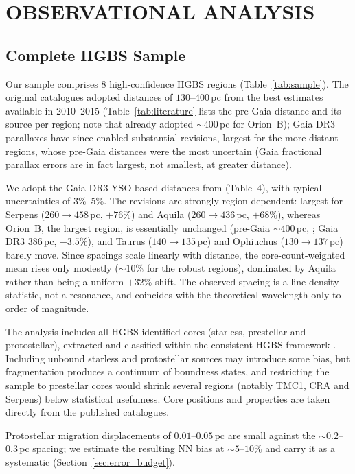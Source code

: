 \documentclass[usenatbib,twoside,twocolumn]{mnras}
\begin{document}
\section{OBSERVATIONAL ANALYSIS}

\subsection{Complete HGBS Sample}

Our sample comprises 8 high-confidence HGBS regions (Table~\ref{tab:sample}). The original catalogues \citep{Konyves2015, Konyves2020, Ladjelate2020, Pezzuto2021} adopted distances of $130$--$400$\,pc from the best estimates available in 2010--2015 (Table~\ref{tab:literature} lists the pre-Gaia distance and its source per region; note that \citealt{Konyves2020} already adopted $\sim400$\,pc for Orion~B); Gaia DR3 parallaxes \citep{Zhang2023} have since enabled substantial revisions, largest for the more distant regions, whose pre-Gaia distances were the most uncertain (Gaia fractional parallax errors are in fact largest, not smallest, at greater distance).

We adopt the Gaia DR3 YSO-based distances from \citet{Zhang2023} (Table~4), with typical uncertainties of 3\%--5\%. The revisions are strongly region-dependent: largest for Serpens ($260\to458$\,pc, $+76\%$) and Aquila ($260\to436$\,pc, $+68\%$), whereas Orion~B, the largest region, is essentially unchanged (pre-Gaia $\sim400$\,pc, \citealt{Konyves2020}; Gaia DR3 $386$\,pc, $-3.5\%$), and Taurus ($140\to135$\,pc) and Ophiuchus ($130\to137$\,pc) barely move. Since spacings scale linearly with distance, the core-count-weighted mean rises only modestly ($\sim10\%$ for the robust regions), dominated by Aquila rather than being a uniform $+32\%$ shift. The observed spacing is a line-density statistic, not a resonance, and coincides with the theoretical wavelength only to order of magnitude.

The analysis includes all HGBS-identified cores (starless, prestellar and protostellar), extracted and classified within the consistent HGBS framework \citep{Konyves2015, Konyves2020}. Including unbound starless and protostellar sources may introduce some bias, but fragmentation produces a continuum of boundness states, and restricting the sample to prestellar cores would shrink several regions (notably TMC1, CRA and Serpens) below statistical usefulness. Core positions and properties are taken directly from the published catalogues.

Protostellar migration displacements of $0.01$--$0.05$\,pc \citep{Kirk2016, Mattern2018} are small against the $\sim0.2$--$0.3$\,pc spacing; we estimate the resulting NN bias at $\sim5$--$10\%$ and carry it as a systematic (Section~\ref{sec:error_budget}).
\end{document}
